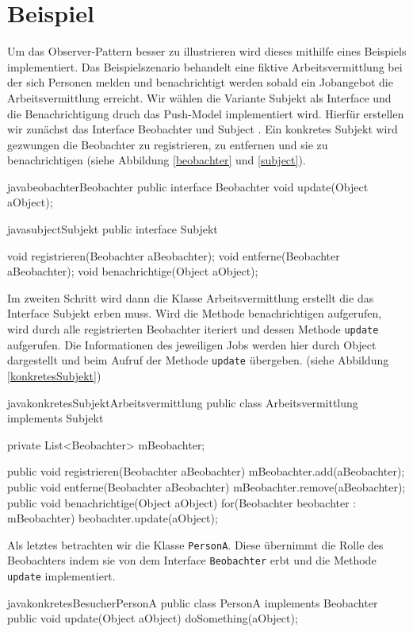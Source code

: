 \section{Beispiel}
Um das Observer-Pattern besser zu illustrieren wird dieses mithilfe eines Beispiels implementiert. Das Beispielszenario behandelt eine fiktive Arbeitsvermittlung bei der sich Personen melden und benachrichtigt werden sobald ein Jobangebot die Arbeitsvermittlung erreicht. Wir wählen die Variante  Subjekt als Interface  und die Benachrichtigung druch das Push-Model implementiert wird. Hierfür erstellen wir zunächst das Interface Beobachter und Subject . Ein konkretes Subjekt wird gezwungen die Beobachter zu registrieren, zu entfernen und sie zu benachrichtigen (siehe Abbildung \ref{beobachter} und \ref{subject}). 



     
 \begin{beispiel}{java}{beobachter}{Beobachter}
public interface Beobachter {
    void update(Object aObject);
}
\end{beispiel}      
      
       
\begin{beispiel}{java}{subject}{Subjekt}
public interface Subjekt {

    void registrieren(Beobachter aBeobachter);
    void entferne(Beobachter aBeobachter);
    void benachrichtige(Object aObject);

}
\end{beispiel}     
      



Im zweiten Schritt wird dann die Klasse Arbeitsvermittlung erstellt die das Interface Subjekt erben muss. Wird die Methode benachrichtigen aufgerufen, wird durch alle registrierten Beobachter iteriert und dessen Methode \texttt{update} aufgerufen. Die Informationen des jeweiligen Jobs werden hier durch Object dargestellt und beim Aufruf der Methode \texttt{update} übergeben. (siehe Abbildung \ref{konkretesSubjekt})

\begin{beispiel}{java}{konkretesSubjekt}{Arbeitsvermittlung}
public class Arbeitsvermittlung implements Subjekt {
    private List<Beobachter> mBeobachter;
    
    public void registrieren(Beobachter aBeobachter) {
        mBeobachter.add(aBeobachter);
    }
    public void entferne(Beobachter aBeobachter) {
        mBeobachter.remove(aBeobachter);
    }
    public void benachrichtige(Object aObject) {
        for(Beobachter beobachter : mBeobachter){
            beobachter.update(aObject);
        }
    }
}
\end{beispiel}

Als letztes betrachten wir die Klasse \texttt{PersonA}. Diese übernimmt die Rolle des Beobachters indem sie von dem Interface \texttt{Beobachter} erbt und die Methode \texttt{update} implementiert.

\begin{beispiel}{java}{konkretesBesucher}{PersonA}
public class PersonA implements Beobachter{
    public void update(Object aObject) {
        doSomething(aObject);
    }
}
\end{beispiel}
